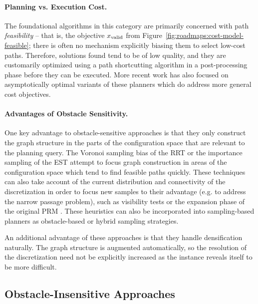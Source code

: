 \paragraph{Planning vs. Execution Cost.}
The foundational algorithms in this category are primarily concerned
with path \emph{feasibility} -- that is, the objective $x_{\mbox{\scriptsize valid}}$
from Figure~\ref{fig:roadmaps:cost-model-feasible};
there is often no mechanism explicitly biasing them to select
low-cost paths.
Therefore, solutions found tend to be of low quality,
and they are customarily optimized using a path shortcutting
algorithm in a post-processing phase before they can be executed.
More recent work has also focused on asymptotically optimal variants
of these planners
\citep{karaman2010rrtstar, karaman2011samplingoptimal, gammell2015bitstar, hauser2015lazy}
which do address more general cost objectives.

\paragraph{Advantages of Obstacle Sensitivity.}
One key advantage to obstacle-sensitive approaches is that
they only construct the graph structure in the parts of the
configuration space that are relevant to the planning query.
The Voronoi sampling bias of the RRT or the importance sampling of the EST
attempt to focus graph construction in areas of the configuration space
which tend to find feasible paths quickly.
These techniques can also take account of the current distribution
and connectivity of the discretization in order to focus new
samples to their advantage
(e.g. to address the narrow passage problem),
such as visibility tests \citep{simeon2000visibilityprms}
or the expansion phase of the original PRM
\citep{kavrakietal1996prm}.
These heuristics can also be incorporated into sampling-based planners
as obstacle-based \citep{boor1999prmgaussiansampling}
or hybrid \citep{hsu2005hybridsampling} sampling strategies.

An additional advantage of these approaches
is that they handle densification naturally.
The graph structure is augmented automatically,
so the resolution of the discretization need not be explicitly
increased as the instance reveals itself to be more difficult.


\subsection{Obstacle-Insensitive Approaches}

